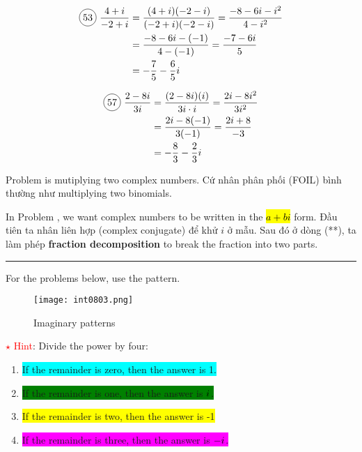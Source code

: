 \begin{multicols}{2}
  \begin{align*}
    \circled{53}\ \frac{4+i}{-2+i}&=\frac{(4+i)(-2-i)}{(-2+i)(-2-i)}=\frac{-8-6i-i^{2}}{4-i^{2}}\\
    &=\frac{-8-6i-(-1)}{4-(-1)}=\frac{-7-6i}{5}\\
    &=-\frac{7}{5}-\frac{6}{5}i\\
  \end{align*}

  \begin{align*}
    \circled{57}\ \frac{2-8i}{3i}&=\frac{(2-8i)(i)}{3i\cdot i}=\frac{2i-8i^{2}}{3i^{2}}\\
    &=\frac{2i-8(-1)}{3(-1)}=\frac{2i+8}{-3}\\
    &=-\frac{8}{3}-\frac{2}{3}i
  \end{align*}
\end{multicols}

Problem  is mutiplying two complex numbers. Cứ nhân phân phối (FOIL) bình thường như multiplying two binomials.

In Problem , we want complex numbers to be written in the \hl{$a+bi$} form. Đầu tiên ta nhân liên hợp (complex conjugate) để khử $i$ ở mẫu. Sau đó ở dòng (**), ta làm phép \textbf{fraction decomposition} to break the fraction into two parts.


\noindent\rule{\textwidth}{0.8pt}

For the problems below, use the pattern.

\begin{figure}[htb!]
  \centering
  \texttt{[image: int0803.png]}
  \caption{Imaginary patterns}
  \label{fig:imaginary_pattern}
\end{figure}

\textcolor{red}{{\LARGE $\star$} Hint}: Divide the power by four:

\begin{enumerate}
  \item \colorbox{cyan}{If the remainder is zero, then the answer is 1.}
  \item \colorbox{green}{If the remainder is one, then the answer is ${i\mkern1mu}$.}
  \item \colorbox{yellow}{If the remainder is two, then the answer is -1}
  \item \colorbox{magenta}{If the remainder is three, then the answer is $-{i\mkern1mu}$.}
\end{enumerate}

